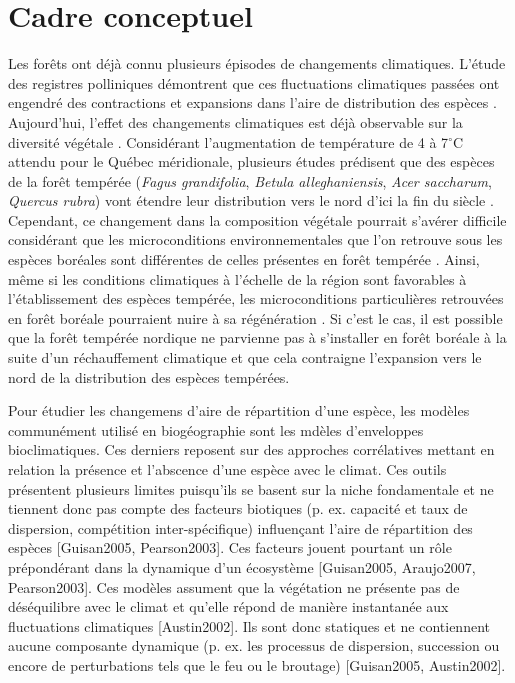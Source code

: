 \section*{Cadre conceptuel}

Les forêts ont déjà connu plusieurs épisodes de changements climatiques. L'étude des registres
polliniques démontrent que ces fluctuations climatiques passées ont engendré des contractions et
expansions dans l'aire de distribution des espèces \citep{Davis2001}. Aujourd'hui, l'effet
des changements climatiques est déjà observable sur la diversité végétale
\citep{Walther2002a,Parmesan2006}. Considérant l'augmentation de température de 4 à 7$^\circ$C
\citep[Scénario RCP 8.5]{Climatique2015} attendu pour le Québec méridionale, plusieurs études
prédisent que des espèces de la forêt tempérée (\textit{Fagus grandifolia}, \textit{Betula
alleghaniensis}, \textit{Acer saccharum}, \textit{Quercus rubra}) vont étendre leur distribution
vers le nord d'ici la fin du siècle \citep{Iverson2002,Sciences2014}. Cependant, ce changement dans
la composition végétale pourrait s'avérer difficile considérant que les microconditions
environnementales que l’on retrouve sous les espèces boréales sont différentes de celles présentes
en forêt tempérée \citep{Barras1998,Caspersen2005}. Ainsi, même si les conditions climatiques à
l'échelle de la région sont favorables à l'établissement des espèces tempérée, les microconditions
particulières retrouvées en forêt boréale pourraient nuire à sa régénération
\citep{DeFrenne2013,Lafleur2010}. Si c’est le cas, il est possible que la forêt tempérée nordique ne
parvienne pas à s'installer en forêt boréale à la suite d’un réchauffement climatique et que cela
contraigne l'expansion vers le nord de la distribution des espèces tempérées.

Pour étudier les changemens d'aire de répartition d'une espèce, les modèles communément utilisé en
biogéographie sont les mdèles d'enveloppes bioclimatiques. Ces derniers reposent sur des approches
corrélatives mettant en relation la présence et l'abscence d'une espèce avec le climat. Ces outils
présentent plusieurs limites puisqu'ils se basent sur la niche fondamentale et ne tiennent donc pas
compte des facteurs biotiques (p. ex. capacité et taux de dispersion, compétition inter-spécifique)
influençant l'aire de répartition des espèces [Guisan2005, Pearson2003]. Ces facteurs jouent
pourtant un rôle prépondérant dans la dynamique d’un écosystème [Guisan2005, Araujo2007,
Pearson2003]. Ces modèles assument que la végétation ne présente pas de déséquilibre avec
le climat et qu'elle répond de manière instantanée aux fluctuations climatiques [Austin2002]. Ils
sont donc statiques et ne contiennent aucune composante dynamique (p. ex. les processus de
dispersion, succession ou encore de perturbations tels que le feu ou le broutage) [Guisan2005,
Austin2002].

